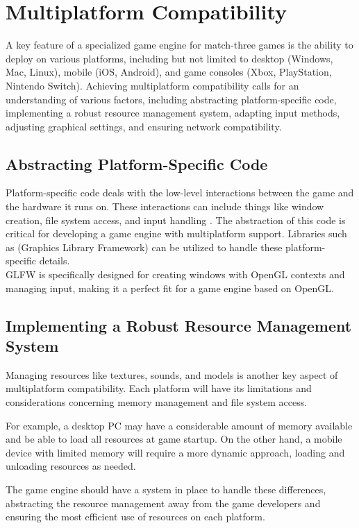 \documentclass[runningheads, 12pt]{llncs}
\begin{document}
\section{Multiplatform Compatibility}
A key feature of a specialized game engine for match-three games is the ability to deploy on various platforms, including but not limited to desktop (Windows, Mac, Linux), mobile (iOS, Android), and game consoles (Xbox, PlayStation, Nintendo Switch). Achieving multiplatform compatibility calls for an understanding of various factors, including abstracting platform-specific code, implementing a robust resource management system, adapting input methods, adjusting graphical settings, and ensuring network compatibility.

\subsection{Abstracting Platform-Specific Code}
Platform-specific code deals with the low-level interactions between the game and the hardware it runs on. These interactions can include things like window creation, file system access, and input handling \cite{ref_book4}. The abstraction of this code is critical for developing a game engine with multiplatform support. Libraries such as (Graphics Library Framework) can be utilized to handle these platform-specific details.
\\ 
GLFW is specifically designed for creating windows with OpenGL contexts and managing input, making it a perfect fit for a game engine based on OpenGL.

\subsection{Implementing a Robust Resource Management System}
Managing resources like textures, sounds, and models is another key aspect of multiplatform compatibility. Each platform will have its limitations and considerations concerning memory management and file system access.

For example, a desktop PC may have a considerable amount of memory available and be able to load all resources at game startup. On the other hand, a mobile device with limited memory will require a more dynamic approach, loading and unloading resources as needed.

The game engine should have a system in place to handle these differences, abstracting the resource management away from the game developers and ensuring the most efficient use of resources on each platform.
\end{document}
